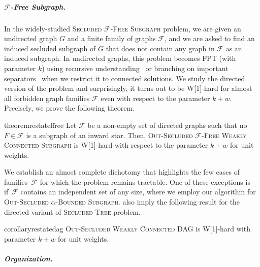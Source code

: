 \subparagraph*{$\mathcal{F}$-Free Subgraph.}
In the widely-studied \textsc{Secluded $\mathcal{F}$-Free Subgraph} problem, we are given an undirected graph $G$ and a finite family of graphs $\mathcal{F}$, and we are asked to find an induced secluded subgraph of $G$ that does not contain any graph in $\mathcal{F}$ as an induced subgraph. In undirected graphs, this problem becomes FPT (with parameter $k$) using recursive understanding~\cite{golovach2020finding} or branching on important separators~\cite{jansen2023single} when we restrict it to connected solutions. We study the directed version of the problem and surprisingly, it turns out to be W[1]-hard for almost all forbidden graph families $\mathcal{F}$ even with respect to the parameter $k+w$. Precisely, we prove the following theorem.

\begin{restatable}[]{theorem}{restateffree}
\label{thm:f-free-hard-always}
    Let $\mathcal{F}$ be a non-empty set of directed graphs such that no $F \in \mathcal{F}$ is a subgraph of an inward star. Then, \textsc{Out-Secluded $\mathcal{F}$-Free Weakly Connected Subgraph} is W[1]-hard with respect to the parameter $k+w$ for unit weights.
\end{restatable}

We establish an almost complete dichotomy that highlights the few cases of families~$\mathcal{F}$ for which the problem remains tractable. One of these exceptions is if~$\mathcal{F}$ contains an independent set of any size, where we employ our algorithm for \textsc{Out-Secluded $\alpha$-Bounded Subgraph}.  also imply the following result for the directed variant of \textsc{Secluded Tree} problem.

\begin{restatable}[]{corollary}{restatedag}
\label{cor:dag_out_k+t}
    \textsc{Out-Secluded Weakly Connected DAG} is W[1]-hard with parameter $k + w$ for unit weights.
\end{restatable}


\subparagraph*{Organization.}

